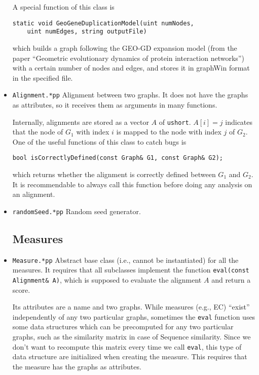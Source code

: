 \documentclass[]{article}
\begin{document}
\begin{itemize}
A special function of this class is
\begin{verbatim}
static void GeoGeneDuplicationModel(uint numNodes,
    uint numEdges, string outputFile)
\end{verbatim}
which builds a graph following the GEO-GD expansion model (from the paper ``Geometric evolutionary dynamics of protein interaction networks'') with a certain number of nodes and edges, and stores it in graphWin format in the specified file.

\item \texttt{Alignment.*pp} Alignment between two graphs. It does not have the graphs as attributes, so it receives them as arguments in many functions.

Internally, alignments are stored as a vector $A$ of \texttt{ushort}. $A[i]=j$ indicates that the node of $G_1$ with index $i$ is mapped to the node with index $j$ of $G_2$.
One of the useful functions of this class to catch bugs is
\begin{verbatim}
bool isCorrectlyDefined(const Graph& G1, const Graph& G2);
\end{verbatim}
which returns whether the alignment is correctly defined between $G_1$ and $G_2$. It is recommendable to always call this function before doing any analysis on an alignment.

\item \texttt{randomSeed.*pp} Random seed generator.

\subsection{Measures}

\item \texttt{Measure.*pp} Abstract base class (i.e., cannot be instantiated) for all the measures. It requires that all subclasses implement the function \texttt{eval(const Alignment\& A)}, which is supposed to evaluate the alignment $A$ and return a score.

Its attributes are a name and two graphs. While measures (e.g., EC) ``exist'' independently of any two particular graphs, sometimes the \texttt{eval} function uses some data structures which can be precomputed for any two particular graphs, such as the similarity matrix in case of Sequence similarity. Since we don't want to recompute this matrix every time we call \texttt{eval}, this type of data structure are initialized when creating the measure. This requires that the measure has the graphs as attributes.


\end{itemize}
\end{document}
